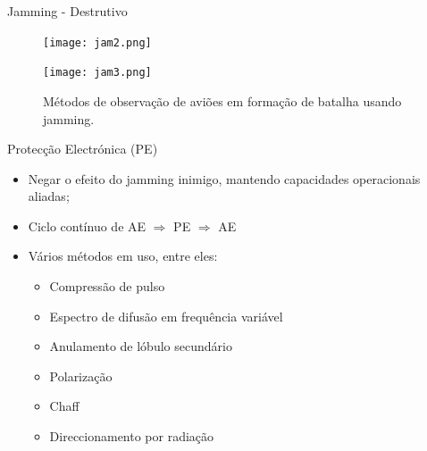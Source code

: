 \documentclass[portuguese,10pt]{beamer}
\begin{document}
\begin{frame}{Jamming - Destrutivo}
    \begin{figure}[ht]
        \begin{minipage}[b]{0.49\linewidth}
            \centering
            \texttt{[image: jam2.png]}
            \caption{Métodos de ocultação aviões (helicópteros) e outros alvos de áreas fixas usando jamming}
            \label{jam2}
        \end{minipage}
        \hspace{\fill}
        \begin{minipage}[b]{0.49\linewidth}
            \centering
            \texttt{[image: jam3.png]}
            \caption{Métodos de observação de aviões em formação de batalha usando jamming.}
            \label{jam3}
        \end{minipage}
    \end{figure}
\end{frame}










\begin{frame}{Protecção Electrónica (PE)}
    \begin{itemize}
        \item Negar o efeito do jamming inimigo, mantendo capacidades operacionais aliadas;
        \vspace*{3mm}
        \item Ciclo contínuo de AE $\Rightarrow$ PE $\Rightarrow$ AE
        \vspace*{3mm}
        \item Vários métodos em uso, entre eles:
        \begin{itemize}
            \item Compressão de pulso
            \item Espectro de difusão em frequência variável
            \item Anulamento de lóbulo secundário
            \item Polarização
            \item Chaff
            \item Direccionamento por radiação
        \end{itemize}
    \end{itemize}
\end{frame}
\end{document}
